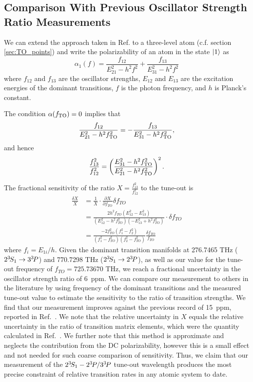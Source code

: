 \subsection{Comparison With Previous Oscillator Strength Ratio Measurements}
	
	We can extend the approach taken in Ref. \cite{Mitroy13} to a three-level atom (c.f. section \ref{sec:TO_points}) and write the polarizability of an atom in the state $|1\rangle$ as 
	\begin{equation}
	\alpha_1(f) = \frac{f_{12}}{E_{21}^2-h^2 f^2}+\frac{f_{13}}{E_{31}^2-h^2 f^2}
	\end{equation}
	where $f_{12}$ and $f_{13}$ are the oscillator strengths, $E_{12}$ and $E_{13}$ are the excitation energies of the dominant transitions, $f$ is the photon frequency, and \(h\) is Planck's constant. 

	The condition $\alpha(f_\mathrm{TO})=0$ implies that
	\begin{equation}
		 \frac{f_{12}}{E_{21}^2-h^2 f_\mathrm{TO}^2} = -\frac{f_{13}}{E_{31}^2-h^2 f_\mathrm{TO}^2},
	\end{equation}
	and hence
	\begin{equation}
		\frac{f_{13}^2}{f_{12}^2} = \left(\frac{E_{31}^2-h^2 f_\mathrm{TO}^2}{E_{21}^2-h^2 f_\mathrm{TO}^2}\right)^2.
	\end{equation}

	The fractional sensitivity of the ratio $X=\frac{f_{13}^2}{f_{12}^2}$ to the tune-out is
	\begin{align}
	    \frac{\delta X}{X} &= \frac{1}{X} \cdot  \frac{\partial X} {\partial f_{TO}} \delta f_{TO} \\
				    &=\frac{2  h^2 f_{TO} (E_{12}^2-E_{13}^2)}{(E_{12}^2-h^2 f_{TO}^2) (-E_{13}^2 + h^2 f_{TO}^2 )} \cdot \delta  f_{TO}\\
				    & = \frac{-2 f_{TO}^2 (f_1^2-f_2^2)}{(f_1^2-f_{TO}^2)(f_2^2-f_{TO}^2)} \frac{\delta  f_{TO}}{f_{TO}}
	\end{align}
	where $f_i=E_{1i}/h$.
	Given the dominant transition manifolds at 276.7465 THz (\(2^{3\!}S_1 \to 3^{3\!}P \)) and 770.7298 THz (\(2^{3\!}S_1 \to 2^{3\!}P\)), as well as our value for the tune-out frequency of \(f_{TO}=725.73670\) THz, we reach a fractional uncertainty in the oscillator strength ratio of 6~ppm.
	We can compare our measurement to others in the literature by using frequency of the dominant transitions and the measured tune-out value to estimate the sensitivity to the ratio of transition strengths. 
	We find that our measurement improves against the previous record of 15~ppm, reported in Ref.~\cite{Leonard15}. 
	We note that the relative uncertainty in $X$ equals the relative uncertainty in the ratio of transition matrix elements, which were the quantity calculated in Ref.~\cite{Leonard15}.
	We further note that this method is approximate and neglects the contribution from the DC polarizability, however this is a small effect and not needed for such coarse comparison of sensitivity. 
	Thus, we claim that our measurement of the $2^{3\!}S_1- 2^{3\!}P / 3^{3\!}P$ tune-out wavelength produces the most precise constraint of relative transition rates in any atomic system to date. 


